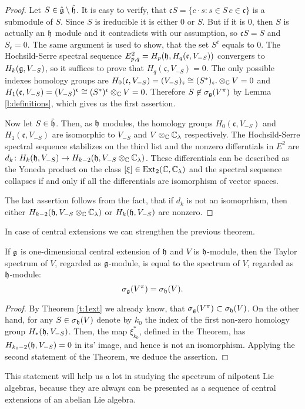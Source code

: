 \begin{proof}
    Let $S \in \hat{\mathfrak{g}} \setminus \hat{\mathfrak{h}}$. It is easy to verify, that $\mathfrak{c}S=\{c\cdot s
    \colon s \in S\, c \in \mathfrak{c}\}$ is a submodule of $S$. Since $S$ is ireducible it is
    either $0$ or $S$. But if it is $0$, then $S$ is actually an $\mathfrak{h}$ module and it contradicts
    with our assumption, so $\mathfrak{c}S = S$ and $S_\mathfrak{c} = 0$. The same argument is used
    to show, that the set $S^\mathfrak{c}$ equals to $0$. The Hochsild-Serre spectral sequence
    $E^2_{p, q} = H_p(\mathfrak{h}, H_q(\mathfrak{c}, V_{-S}))$ convergers to $H_k(\mathfrak{g}, V_{-S})$, so it
    suffices to prove that $H_q(\mathfrak{c}, V_{- S})= 0$. The only possible indexes homology
    groups are $H_0(\mathfrak{c}, V_{-S}) = (V_{-S})_\mathfrak{c} \cong (S^*)_\mathfrak{c}.
    \otimes_{\mathbb{C}} V = 0$ and $H_1(\mathfrak{c}, V_{-S}) = (V_{-S})^\mathfrak{c} \cong
    (S^*)^\mathfrak{c} \otimes_{\mathbb{C}} V = 0$. Therefore $S \not\in \sigma_{\mathfrak{g}}(V^\pi)$ by Lemma
    \ref{l:definitions}, which gives us the first assertion.

    Now let $S \in \hat{\mathfrak{h}}$. Then, as $\mathfrak{h}$ modules, the homology groups $H_0(\mathfrak{c},
    V_{-S})$ and $H_1(\mathfrak{c}, V_{-S})$ are isomorphic to $V_{-S}$ and $V\otimes_{\mathbb{C}}
    \mathbb{C}_\lambda$ respectively. The Hochsild-Serre spectral sequence stabilizes on the third list
    and the nonzero differntials in $E^2$ are $d_k\colon H_k(\mathfrak{h}, V_{-S}) \to H_{k - 2}(\mathfrak{h},
    V_{-S}\otimes_{\mathbb{C}} \mathbb{C}_\lambda)$. These differentials can be described as the Yoneda product on
    the class $[\xi] \in \operatorname{Ext}_2(\mathbb{C}, \mathbb{C}_\lambda)$ and the spectral sequence collapses if and only
    if all the differentials are isomorphism of vector spaces.

    The last assertion follows from the fact, that if $d_k$ is not an isomoprhism, then either
    $H_{k - 2}(\mathfrak{h},  V_{-S}\otimes_{\mathbb{C}} \mathbb{C}_\lambda)$ or $H_k(\mathfrak{h}, V_{-S})$ are nonzero.
\end{proof}
In case of central extensions we can strengthen the previous theorem.
\begin{corollary}
    If $\mathfrak{g}$ is one-dimensional central extension of $\mathfrak{h}$ and $V$ is $\mathfrak{h}$-module, then
    the Taylor spectrum of $V$, regarded as $\mathfrak{g}$-module, is equal to the spectrum of $V$,
    regarded as $\mathfrak{h}$-module:
    \[
        \sigma_{\mathfrak{g}}(V^\pi) = \sigma_{\mathfrak{h}}(V).
    \]

\end{corollary}
\begin{proof}
    By Theorem \ref{t:1ext} we already know, that $\sigma_{\mathfrak{g}}(V^\pi) \subset \sigma_{\mathfrak{h}}(V)$. On
    the other hand, for any $S\in \sigma_{\mathfrak{h}}(V)$ denote by $k_0$ the index of the first non-zero
    homology group $H_*(\mathfrak{h}, V_{-S})$. Then, the map $\xi^*_{k_0}$, defined in the Theorem, has
    $H_{k_0 - 2}(\mathfrak{h}, V_{-S}) = 0$ in its' image, and hence is not an isomorphism. Applying the
    second statement of the Theorem, we deduce the assertion.
\end{proof}
This statement will help us a lot in studying the spectrum of nilpotent Lie algebras, because they are
always can be presented as a sequence of central extensions of an abelian Lie algebra.
